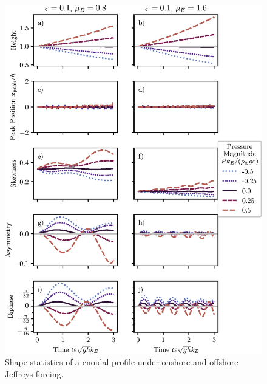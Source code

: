 \documentclass{jfm}
\begin{document}
\begin{figure}
  \centering
  \includegraphics{Skew-Asymm-Cnoidal.eps}
  \caption{
    Shape statistics of a cnoidal profile under onshore and offshore
    Jeffreys forcing.
  }
\end{figure}
\end{document}
